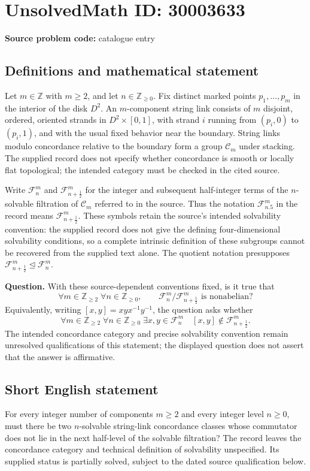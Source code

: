 \documentclass[11pt]{article}
\newcommand{\Z}{\mathbb{Z}}
\begin{document}
\section*{UnsolvedMath ID: 30003633}
\textbf{Source problem code:} catalogue entry
\subsection{Definitions and mathematical statement}
Let \(m\in\Z\) with \(m\geq2\), and let \(n\in\Z_{\geq0}\). Fix distinct marked points \(p_1,\ldots,p_m\) in the interior of the disk \(D^2\). An \(m\)-component string link consists of \(m\) disjoint, ordered, oriented strands in \(D^2\times[0,1]\), with strand \(i\) running from \((p_i,0)\) to \((p_i,1)\), and with the usual fixed behavior near the boundary. String links modulo concordance relative to the boundary form a group \(\mathcal C_m\) under stacking. The supplied record does not specify whether concordance is smooth or locally flat topological; the intended category must be checked in the cited source.

Write \(\mathcal F_n^m\) and \(\mathcal F_{n+\frac12}^m\) for the integer and subsequent half-integer terms of the \(n\)-solvable filtration of \(\mathcal C_m\) referred to in the source. Thus the notation \(\mathcal F_{n.5}^m\) in the record means \(\mathcal F_{n+\frac12}^m\). These symbols retain the source's intended solvability convention: the supplied record does not give the defining four-dimensional solvability conditions, so a complete intrinsic definition of these subgroups cannot be recovered from the supplied text alone. The quotient notation presupposes \(\mathcal F_{n+\frac12}^m\trianglelefteq\mathcal F_n^m\).

\textbf{Question.} With these source-dependent conventions fixed, is it true that
\[
\forall m\in\Z_{\geq2}\;\forall n\in\Z_{\geq0},\qquad
\mathcal F_n^m/\mathcal F_{n+\frac12}^m
\text{ is nonabelian}?
\]
Equivalently, writing \([x,y]=xyx^{-1}y^{-1}\), the question asks whether
\[
\forall m\in\Z_{\geq2}\;\forall n\in\Z_{\geq0}\;
\exists x,y\in\mathcal F_n^m
\quad [x,y]\notin\mathcal F_{n+\frac12}^m.
\]
The intended concordance category and precise solvability convention remain unresolved qualifications of this statement; the displayed question does not assert that the answer is affirmative.
\subsection{Short English statement}
For every integer number of components \(m\geq2\) and every integer level \(n\geq0\), must there be two \(n\)-solvable string-link concordance classes whose commutator does not lie in the next half-level of the solvable filtration? The record leaves the concordance category and technical definition of solvability unspecified. Its supplied status is partially solved, subject to the dated source qualification below.
\end{document}
